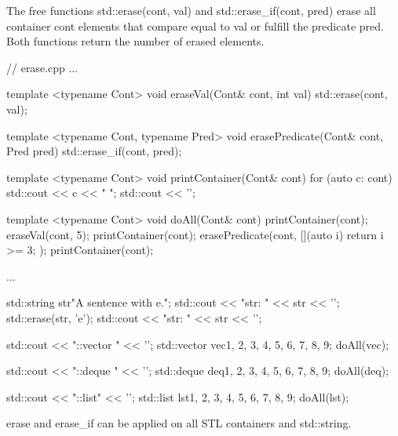 The free functions std::erase(cont, val) and std::erase\_if(cont, pred) erase all container cont elements that compare equal to val or fulfill the predicate pred. Both functions return the number of erased elements.


\begin{cpp}
// erase.cpp
...

template <typename Cont>
void eraseVal(Cont& cont, int val) {
	std::erase(cont, val);
}

template <typename Cont, typename Pred>
void erasePredicate(Cont& cont, Pred pred) {
	std::erase_if(cont, pred);
}

template <typename Cont>
void printContainer(Cont& cont) {
	for (auto c: cont) std::cout << c << " ";
	std::cout << '\n';
}

template <typename Cont>
void doAll(Cont& cont) {
	printContainer(cont);
	eraseVal(cont, 5);
	printContainer(cont);
	erasePredicate(cont, [](auto i) { return i >= 3; } );
	printContainer(cont);
}

...

std::string str{"A sentence with e."};
std::cout << "str: " << str << '\n';
std::erase(str, 'e');
std::cout << "str: " << str << '\n';

std::cout << "\nstd::vector " << '\n';
std::vector vec{1, 2, 3, 4, 5, 6, 7, 8, 9};
doAll(vec);

std::cout << "\nstd::deque " << '\n';
std::deque deq{1, 2, 3, 4, 5, 6, 7, 8, 9};
doAll(deq);

std::cout << "\nstd::list" << '\n';
std::list lst{1, 2, 3, 4, 5, 6, 7, 8, 9};
doAll(lst);
\end{cpp}

erase and erase\_if can be applied on all STL containers and std::string.


